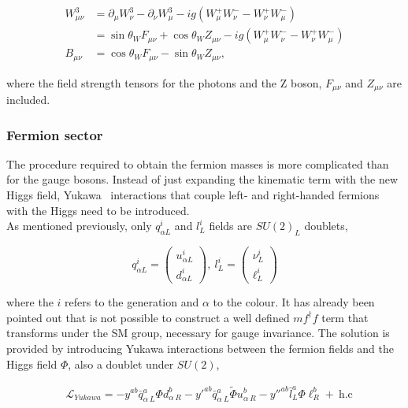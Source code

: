 \begin{equation}
\begin{split}
    W_{\mu\nu}^3 &= \partial_\mu W_\nu^3 - \partial_\nu W_\mu^3 - ig(W_\mu^+W_\nu^- - W_\nu^+ W_\mu^-)\\
    &= \sin\theta_W F_{\mu\nu} + \cos\theta_W Z_{\mu\nu} - ig(W_\mu^+W_\nu^- - W_\nu^+ W_\mu^-)\\
    B_{\mu\nu} &= \cos\theta_W F_{\mu\nu} - \sin\theta_W Z_{\mu\nu},
\end{split}
\end{equation}

where the field strength tensors for the photons and the Z boson, $F_{\mu\nu}$ and $Z_{\mu\nu}$ are included.

\subsubsection{Fermion sector}%

The procedure required to obtain the fermion masses is more complicated than for the gauge bosons. Instead of just expanding the kinematic term with the new Higgs field, Yukawa~\cite{yukawa} interactions that couple left- and right-handed fermions with the Higgs need to be introduced.\\

As mentioned previously, only $q_{\alpha L}^i$ and $l^i_L$ fields are $SU(2)_L$ doublets,

\begin{equation}
    \label{Theory_eq:SUdoublets}
    q_{\alpha L}^i=\begin{pmatrix} u^i_{\alpha L} \\ d^i_{\alpha L} \end{pmatrix},\ l_L^i = \begin{pmatrix} \nu^i_L \\ \ell^i_L \end{pmatrix}
\end{equation}

where the $i$ refers to the generation and $\alpha$ to the colour. It has already been pointed out that is not possible to construct a well defined $mf^\dag f$ term that transforms under the SM group, necessary for gauge invariance. The solution is provided by introducing Yukawa interactions between the fermion fields and the Higgs field $\Phi$, also a doublet under $SU(2)$,

\begin{equation}
\begin{split}
    &\mathcal{L}_{Yukawa} = -y^{ab}\bar{q}^a_{\alpha\ L}\Phi d^b_{\alpha\ R} - y'^{ab}\bar{q}^a_{\alpha\ L}\tilde{\Phi} u^b_{\alpha\ R}-y''^{ab}\bar{l}^a_{L}\Phi \ell^b_{R}+\ \text{h.c}\\
\end{split}
\end{equation}

